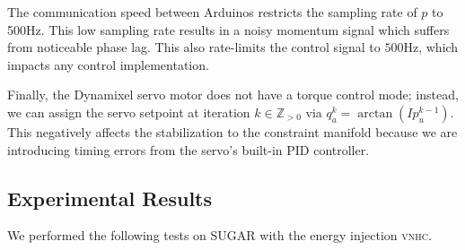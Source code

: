 \documentclass[journal,twoside,web, twocolumn,draftcls]{ieeecolor}
\newcommand*{\vnhc}{\textsc{vnhc}\xspace}
\begin{document}
The communication speed between Arduinos restricts the sampling rate of \(p\) to
500Hz.
This low sampling rate results in a noisy momentum signal which suffers
from noticeable phase lag.
This also rate-limits the control signal to \(500\)Hz, which impacts any control
implementation.

Finally, the Dynamixel servo motor does not have a torque control mode; instead,
we can assign the servo setpoint at iteration \(k \in \mathbb{Z}_{> 0}\)
via \(q_a^{k} = \arctan(I p_u^{k-1})\).
This negatively affects the stabilization to the constraint
manifold because we are introducing timing errors from the servo's built-in PID
controller.

\subsection{Experimental Results}

We performed the following tests on SUGAR with the energy injection \vnhc.
\end{document}
